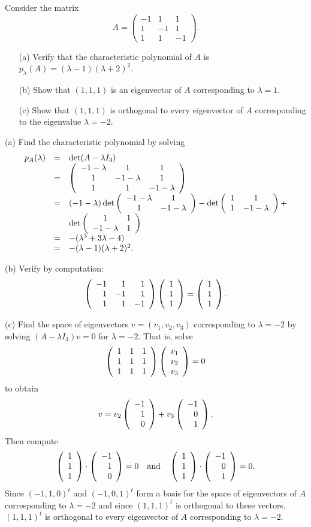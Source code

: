\documentclass{ximera}
\begin{document}
\begin{exercise} \label{c10.2.3}
Consider the matrix  
\[
A = \left(\begin{array}{rrr} -1 & 1 & 1 \\ 1 & -1 & 1 \\ 1 & 1 & -1 
\end{array}\right).
\]
\begin{itemize}
\item[(a)] Verify that the characteristic polynomial of $A$ is
 $p_\lambda(A)=(\lambda-1)(\lambda+2)^2$.
\item[(b)] Show that $(1,1,1)$ is an eigenvector of $A$ corresponding to 
$\lambda=1$.
\item[(c)] Show that $(1,1,1)$ is orthogonal to every eigenvector 
of $A$ corresponding to the eigenvalue $\lambda=-2$.
\end{itemize}

\begin{solution}

(a) Find the characteristic polynomial by solving
\[
\begin{array}{rcl}
p_A(\lambda) & = & \det(A - \lambda I_3) \\
& = & \left(\begin{array}{ccc} -1 - \lambda & 1 & 1 \\ 1 & -1 - \lambda & 1 \\ 1 & 1 & -1 - \lambda\end{array}\right) \\
& = & (-1 - \lambda)\det\left(\begin{array}{cc} -1 - \lambda & 1\\ 1 &-1 - \lambda\end{array}\right)
- \det\left(\begin{array}{cc} 1 & 1\\ 1 &-1 - \lambda\end{array}\right) + \\
& & \det\left(\begin{array}{cc} 1 & 1\\ -1 - \lambda &1\end{array}\right) \\
& = & -(\lambda^3 + 3\lambda - 4) \\
& = & -(\lambda - 1)(\lambda + 2)^2. \end{array}
\]

(b) Verify by computation:
\[
\left(\begin{array}{rrr} -1 & 1 & 1 \\ 1 & -1 & 1 \\ 1 & 1 & -1\end{array}\right)\left(\begin{array}{r} 1 \\ 1 \\ 1\end{array}\right) =
\left(\begin{array}{r} 1 \\ 1 \\ 1\end{array}\right).
\]

(c) Find the space of eigenvectors $v = (v_1,v_2,v_3)$ corresponding
to $\lambda = -2$ by solving $(A - \lambda I_3)v = 0$ for $\lambda = -2$.
That is, solve
\[
\left(\begin{array}{rrr} 1 & 1 & 1 \\ 1 & 1 & 1 \\ 1 & 1 & 1\end{array}\right)\left(\begin{array}{r} v_1 \\ v_2 \\ v_3\end{array}\right) = 0
\]
to obtain
\[
v = v_2\left(\begin{array}{r} -1 \\ 1 \\ 0\end{array}\right) + v_3\left(\begin{array}{r} -1 \\ 0 \\ 1\end{array}\right).
\]
Then compute
\[
\left(\begin{array}{r} 1 \\ 1 \\ 1\end{array}\right) \cdot \left(\begin{array}{r} -1 \\ 1 \\ 0\end{array}\right) = 0 \quad\mbox{and}\quad
\left(\begin{array}{r} 1 \\ 1 \\ 1\end{array}\right) \cdot \left(\begin{array}{r} -1 \\ 0 \\ 1\end{array}\right) = 0.
\]
Since $(-1,1,0)^t$ and $(-1,0,1)^t$ form a basis for the space of
eigenvectors of $A$ corresponding to $\lambda = -2$ and since
$(1,1,1)^t$ is orthogonal to these vectors, $(1,1,1)^t$ is
orthogonal to every eigenvector of $A$ corresponding to
$\lambda = -2$.

\end{solution}
\end{exercise}
\end{document}
